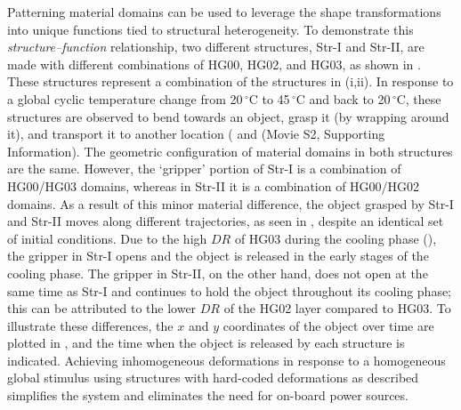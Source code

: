 Patterning material domains can be used to leverage the shape transformations into unique functions tied to structural heterogeneity.
To demonstrate this \textit{structure--function} relationship, two different structures, Str-I and Str-II, are made with different combinations of HG00, HG02, and HG03, as shown in . These structures represent a combination of the structures in (i,ii). 
In response to a global cyclic temperature change from 20\,$^{\circ}$C to 45\,$^{\circ}$C
and back to 20\,$^{\circ}$C, these structures are observed to bend towards an object, grasp it (by wrapping around it), and transport it to another location ( and (Movie S2, Supporting Information). The geometric configuration of material domains in both structures are the same. However, the `gripper' portion of Str-I is a combination of HG00/HG03 domains, whereas in Str-II it is a combination of HG00/HG02 domains. As a result of this minor material difference, the object grasped by Str-I and Str-II moves along different trajectories, as seen in , despite an identical set of initial conditions. Due to the high $DR$ of HG03  
during the cooling phase (), the gripper in Str-I opens and the object is released in the early stages of the cooling phase. 
The gripper in Str-II, on the other hand, does not open at the same time as Str-I and continues to hold the object throughout its cooling phase; this can be attributed to the lower $DR$ of the HG02 layer compared to HG03. To illustrate these differences, the $x$ and $y$ coordinates of the object over time are plotted %
in , and the time when the object is released by each structure is indicated. Achieving inhomogeneous deformations in response to a homogeneous global stimulus using structures with hard-coded deformations as described simplifies the system and eliminates the need for on-board power sources.\\ 

